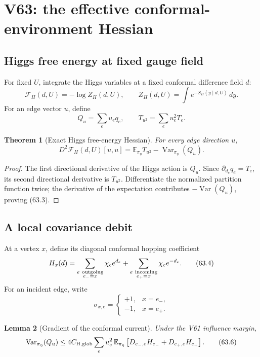 \documentclass[11pt]{article}
\newtheorem{theorem}{Theorem}[section]
\newtheorem{lemma}[theorem]{Lemma}
\theoremstyle{remark}
\begin{document}
\section{V63: the effective conformal-environment Hessian}
\label{sec:v17v63}

\subsection{Higgs free energy at fixed gauge field}

For fixed \(U\), integrate the Higgs variables at a fixed conformal
difference field \(d\):
\[
 \mathcal F_H(d,U)=-\log Z_H(d,U),\qquad
 Z_H(d,U)=\int e^{-S_H(y\mid d,U)}\,dy.            \tag{63.1}
\]
For an edge vector \(u\), define
\[
 Q_u=\sum_eu_eq_e,\qquad
 T_{u^2}=\sum_eu_e^2T_e.                          \tag{63.2}
\]

\begin{theorem}[Exact Higgs free-energy Hessian]
\label{thm:v17v63-exact}
For every edge direction \(u\),
\[
\boxed{
 D^2\mathcal F_H(d,U)[u,u]
 =
 \mathbb E_{\pi_\eta}T_{u^2}
 -\operatorname{Var}_{\pi_\eta}(Q_u).}            \tag{63.3}
\]
\end{theorem}

\begin{proof}
The first directional derivative of the Higgs action is \(Q_u\).
Since \(\partial_{d_e}q_e=T_e\), its second directional derivative is
\(T_{u^2}\).  Differentiate the normalized partition function twice;
the derivative of the expectation contributes
\(-\operatorname{Var}(Q_u)\), proving (63.3).
\end{proof}

\subsection{A local covariance debit}

At a vertex \(x\), define its diagonal conformal hopping coefficient
\[
 H_x(d)=
 \sum_{\substack{e\ {\rm outgoing}\\e_-=x}}
 \chi_ee^{d_e}
 +
 \sum_{\substack{e\ {\rm incoming}\\e_+=x}}
 \chi_ee^{-d_e}.                                  \tag{63.4}
\]
For an incident edge, write
\[
 \sigma_{x,e}=
 \begin{cases}
 +1,&x=e_-,\\
 -1,&x=e_+.
 \end{cases}                                      \tag{63.5}
\]

\begin{lemma}[Gradient of the conformal current]
\label{lem:v17v63-gradient}
Under the V61 influence margin,
\[
\operatorname{Var}_{\pi_\eta}(Q_u)
 \leq
 4C_{\rm H,glob}
 \sum_eu_e^2\,
 \mathbb E_{\pi_\eta}
 \left[
 D_{e_-,e}H_{e_-}
 +D_{e_+,e}H_{e_+}
 \right].                                        \tag{63.6}
\]
\end{lemma}
\end{document}
